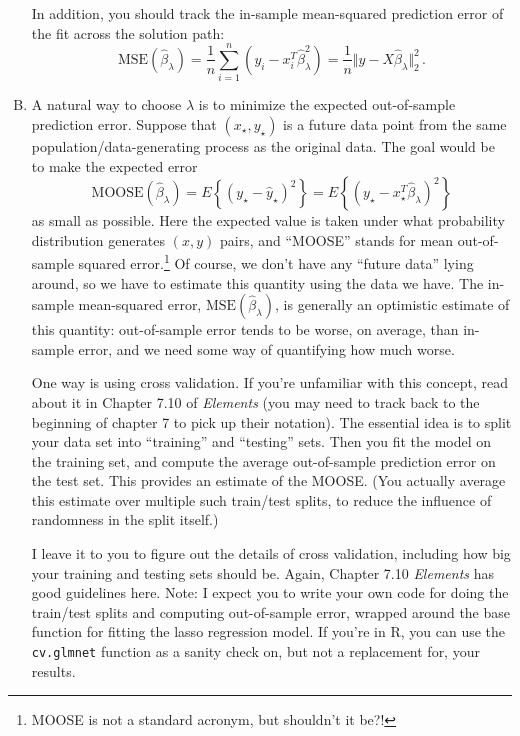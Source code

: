 \documentclass{mynotes}
\begin{document}
\begin{enumerate}[(A)]
In addition, you should track the in-sample mean-squared prediction error of the fit across the solution path:
$$
\mathrm{MSE}(\hat \beta_{\lambda}) = \frac{1}{n} \sum_{i=1}^n (y_i - x_i^T \hat \beta_{\lambda}^2) = \frac{1}{n} \Vert y - X \hat \beta_{\lambda} \Vert_2^2 \, .
$$

\item A natural way to choose $\lambda$ is to minimize the expected out-of-sample prediction error.  Suppose that $(x_{\star}, y_{\star})$ is a future data point from the same population/data-generating process as the original data.  The goal would be to make the expected error
$$
\mathrm{MOOSE}(\hat{\beta}_{\lambda}) =  E \left\{ (y_{\star} - \hat{y}_{\star} )^2 \right\} = E \left\{ (y_{\star} - x_\star^T \hat{\beta}_{\lambda} )^2 \right\} 
$$
as small as possible.  Here the expected value is taken under what probability distribution generates $(x,y)$ pairs, and ``MOOSE'' stands for mean out-of-sample squared error.\footnote{MOOSE is not a standard acronym, but shouldn't it be?!}  Of course, we don't have any ``future data'' lying around, so we have to estimate this quantity using the data we have.  The in-sample mean-squared error, $\mathrm{MSE}(\hat \beta_{\lambda})$, is generally an optimistic estimate of this quantity: out-of-sample error tends to be worse, on average, than in-sample error, and we need some way of quantifying how much worse.

One way is using cross validation.  If you're unfamiliar with this concept, read about it in Chapter 7.10 of \textit{Elements} (you may need to track back to the beginning of chapter 7 to pick up their notation).  The essential idea is to split your data set into ``training'' and ``testing'' sets.  Then you fit the model on the training set, and compute the average out-of-sample prediction error on the test set.  This provides an estimate of the MOOSE.  (You actually average this estimate over multiple such train/test splits, to reduce the influence of randomness in the split itself.)

I leave it to you to figure out the details of cross validation, including how big your training and testing sets should be.  Again, Chapter 7.10 \textit{Elements} has good guidelines here.  Note: I expect you to write your own code for doing the train/test splits and computing out-of-sample error, wrapped around the base function for fitting the lasso regression model.   If you're in R, you can use the \verb|cv.glmnet| function as a sanity check on, but not a replacement for, your results.


\end{enumerate}
\end{document}
